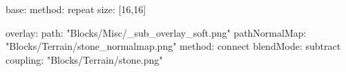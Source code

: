 base:
  method: repeat
  size: [16,16]

overlay:
  path: "Blocks/Misc/_sub_overlay_soft.png"
  pathNormalMap: "Blocks/Terrain/stone_normalmap.png"
  method: connect
  blendMode: subtract
  coupling: "Blocks/Terrain/stone.png"


